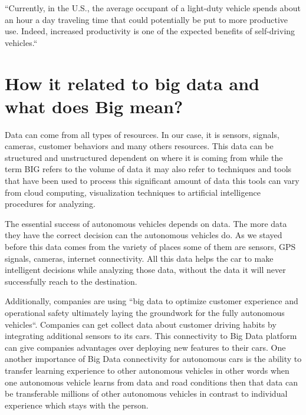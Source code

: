 \documentclass{acmart}
\begin{document}
\begin{center}
    ``Currently, in the U.S., the average occupant of a light-duty vehicle spends about an hour a
day traveling time that could potentially be put to more productive use. Indeed, increased
productivity is one of the expected benefits of self-driving vehicles.``\cite{michigan}
\end{center}



\section{How it related to big data and what does Big mean?}
\par Data can come from all types of resources. In our case, it is sensors, signals, cameras, customer behaviors and many others resources. This data can be structured and unstructured dependent on where it is coming from while the term BIG refers to the volume of data it may also refer to techniques and tools that have been used to process this significant amount of data this tools can vary from cloud computing, visualization techniques to artificial intelligence procedures for analyzing.\cite{www-webo}

\par The essential success of autonomous vehicles depends on data. The more data they have the correct decision can the autonomous vehicles do. As we stayed before this data comes from the variety of places some of them are sensors, GPS signals, cameras, internet connectivity. All this data helps the car to make intelligent decisions while analyzing those data, without the data it will never successfully reach to the destination.\cite{www-kdnuggets}

\par Additionally, companies are using ``big data to optimize customer experience and operational safety ultimately laying the groundwork for the fully autonomous vehicles``.\cite{www-webo} Companies can get collect data about customer driving habits by integrating additional sensors to its cars.\cite{www-hb.org} This connectivity to Big Data platform can give companies advantages over deploying new features to their cars. One another importance of Big Data connectivity for autonomous cars is the ability to transfer learning experience to other autonomous vehicles in other words when one autonomous vehicle learns from data and road conditions then that data can be transferable millions of other autonomous vehicles in contrast to individual experience which stays with the person. \cite{www-hb.org}
\end{document}
